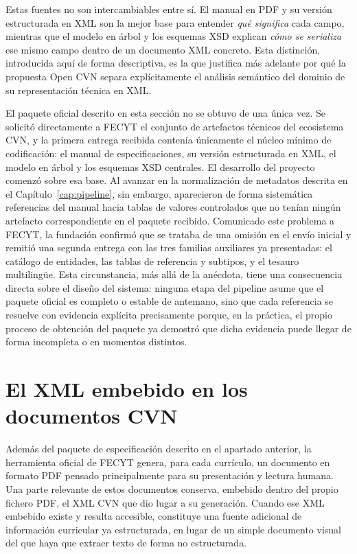 Estas fuentes no son intercambiables entre sí. El manual en PDF y su versión
estructurada en XML son la mejor base para entender \emph{qué significa} cada
campo, mientras que el modelo en árbol y los esquemas XSD explican \emph{cómo se
serializa} ese mismo campo dentro de un documento XML concreto. Esta distinción,
introducida aquí de forma descriptiva, es la que justifica más adelante por qué
la propuesta Open CVN separa explícitamente el análisis semántico del dominio de
su representación técnica en XML.

El paquete oficial descrito en esta sección no se obtuvo de una única vez. Se
solicitó directamente a FECYT el conjunto de artefactos técnicos del
ecosistema CVN, y la primera entrega recibida contenía únicamente el núcleo
mínimo de codificación: el manual de especificaciones, su versión
estructurada en XML, el modelo en árbol y los esquemas XSD centrales. El
desarrollo del proyecto comenzó sobre esa base. Al avanzar en la
normalización de metadatos descrita en el Capítulo~\ref{cap:pipeline}, sin
embargo, aparecieron de forma sistemática referencias del manual hacia
tablas de valores controlados que no tenían ningún artefacto correspondiente
en el paquete recibido. Comunicado este problema a FECYT, la fundación
confirmó que se trataba de una omisión en el envío inicial y remitió una
segunda entrega con las tres familias auxiliares ya presentadas: el catálogo
de entidades, las tablas de referencia y subtipos, y el tesauro
multilingüe. Esta circunstancia, más allá de la anécdota, tiene una
consecuencia directa sobre el diseño del sistema: ninguna etapa del pipeline
asume que el paquete oficial es completo o estable de antemano, sino que
cada referencia se resuelve con evidencia explícita precisamente porque, en
la práctica, el propio proceso de obtención del paquete ya demostró que
dicha evidencia puede llegar de forma incompleta o en momentos distintos.

\section{El XML embebido en los documentos CVN}
\label{sec:ecosistema_pdf_embebido}

Además del paquete de especificación descrito en el apartado anterior, la
herramienta oficial de FECYT genera, para cada currículo, un documento en
formato PDF pensado principalmente para su presentación y lectura humana. Una
parte relevante de estos documentos conserva, embebido dentro del propio
fichero PDF, el XML CVN que dio lugar a su generación. Cuando ese XML embebido
existe y resulta accesible, constituye una fuente adicional de información
curricular ya estructurada, en lugar de un simple documento visual del que haya
que extraer texto de forma no estructurada.

